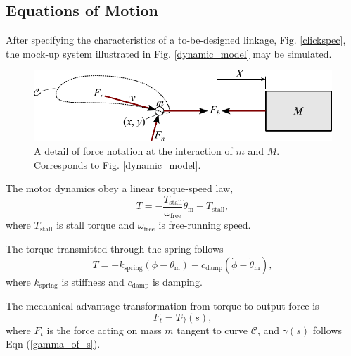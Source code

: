 \documentclass[journal]{IEEEtran}
\begin{document}
\subsection{Equations of Motion}
\label{sec:eq_of_mot}

After specifying the characteristics of a to-be-designed linkage, Fig. \ref{clickspec}, the mock-up system illustrated in Fig. \ref{dynamic_model} may be simulated.

\begin{figure}[t]
\centering
\includegraphics[scale=0.65]{dynamic_model_detail}
\caption{A detail of force notation at the interaction of $m$ and $M$.  Corresponds to Fig. \ref{dynamic_model}.}
\label{dynamic_model_detail}
\end{figure}

The motor dynamics obey a linear torque-speed law,
\begin{equation}
T = -\frac{T_\text{stall}}{\omega_\text{free}} \dot{\theta}_\text{m} + T_\text{stall},
\label{torque-speed}
\end{equation}
where $T_\text{stall}$ is stall torque and $\omega_\text{free}$ is free-running speed.

The torque transmitted through the spring follows
\begin{equation}
T = -k_\text{spring}(\phi - \theta_\text{m}) - c_\text{damp}(\dot{\phi} - \dot{\theta}_\text{m}),
\end{equation}
where $k_\text{spring}$ is stiffness and $c_\text{damp}$ is damping.



The mechanical advantage transformation from torque to output force is
\begin{equation}
F_t = T \gamma(s),
\end{equation}
where $F_t$ is the force acting on mass $m$ tangent to curve $\mathcal{C}$, and $\gamma(s)$ follows Eqn (\ref{gamma_of_s}).
\end{document}
